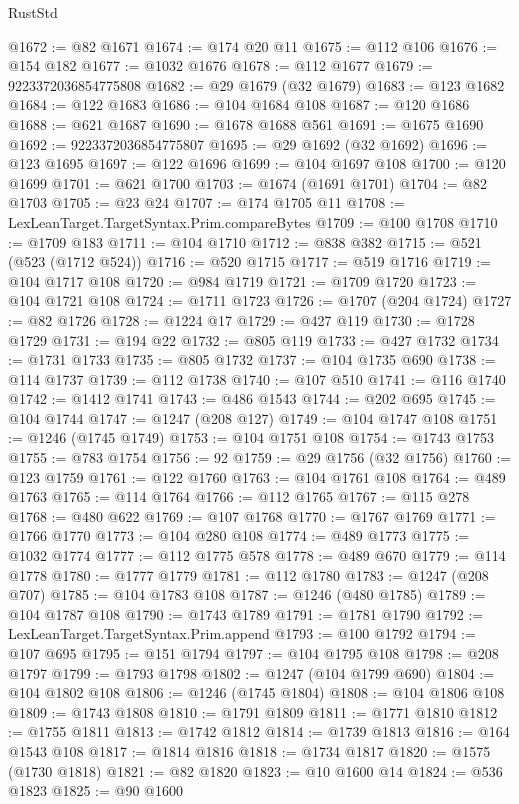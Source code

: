 \begin{lexlean}{RustStd}
\begin{coremodule}
@1672 := @82 @1671
@1674 := @174 @20 @11
@1675 := @112 @106
@1676 := @154 @182
@1677 := @1032 @1676
@1678 := @112 @1677
@1679 := 9223372036854775808
@1682 := @29 @1679 (@32 @1679)
@1683 := @123 @1682
@1684 := @122 @1683
@1686 := @104 @1684 @108
@1687 := @120 @1686
@1688 := @621 @1687
@1690 := @1678 @1688 @561
@1691 := @1675 @1690
@1692 := 9223372036854775807
@1695 := @29 @1692 (@32 @1692)
@1696 := @123 @1695
@1697 := @122 @1696
@1699 := @104 @1697 @108
@1700 := @120 @1699
@1701 := @621 @1700
@1703 := @1674 (@1691 @1701)
@1704 := @82 @1703
@1705 := @23 @24
@1707 := @174 @1705 @11
@1708 := LexLeanTarget.TargetSyntax.Prim.compareBytes
@1709 := @100 @1708
@1710 := @1709 @183
@1711 := @104 @1710
@1712 := @838 @382
@1715 := @521 (@523 (@1712 @524))
@1716 := @520 @1715
@1717 := @519 @1716
@1719 := @104 @1717 @108
@1720 := @984 @1719
@1721 := @1709 @1720
@1723 := @104 @1721 @108
@1724 := @1711 @1723
@1726 := @1707 (@204 @1724)
@1727 := @82 @1726
@1728 := @1224 @17
@1729 := @427 @119
@1730 := @1728 @1729
@1731 := @194 @22
@1732 := @805 @119
@1733 := @427 @1732
@1734 := @1731 @1733
@1735 := @805 @1732
@1737 := @104 @1735 @690
@1738 := @114 @1737
@1739 := @112 @1738
@1740 := @107 @510
@1741 := @116 @1740
@1742 := @1412 @1741
@1743 := @486 @1543
@1744 := @202 @695
@1745 := @104 @1744
@1747 := @1247 (@208 @127)
@1749 := @104 @1747 @108
@1751 := @1246 (@1745 @1749)
@1753 := @104 @1751 @108
@1754 := @1743 @1753
@1755 := @783 @1754
@1756 := 92
@1759 := @29 @1756 (@32 @1756)
@1760 := @123 @1759
@1761 := @122 @1760
@1763 := @104 @1761 @108
@1764 := @489 @1763
@1765 := @114 @1764
@1766 := @112 @1765
@1767 := @115 @278
@1768 := @480 @622
@1769 := @107 @1768
@1770 := @1767 @1769
@1771 := @1766 @1770
@1773 := @104 @280 @108
@1774 := @489 @1773
@1775 := @1032 @1774
@1777 := @112 @1775 @578
@1778 := @489 @670
@1779 := @114 @1778
@1780 := @1777 @1779
@1781 := @112 @1780
@1783 := @1247 (@208 @707)
@1785 := @104 @1783 @108
@1787 := @1246 (@480 @1785)
@1789 := @104 @1787 @108
@1790 := @1743 @1789
@1791 := @1781 @1790
@1792 := LexLeanTarget.TargetSyntax.Prim.append
@1793 := @100 @1792
@1794 := @107 @695
@1795 := @151 @1794
@1797 := @104 @1795 @108
@1798 := @208 @1797
@1799 := @1793 @1798
@1802 := @1247 (@104 @1799 @690)
@1804 := @104 @1802 @108
@1806 := @1246 (@1745 @1804)
@1808 := @104 @1806 @108
@1809 := @1743 @1808
@1810 := @1791 @1809
@1811 := @1771 @1810
@1812 := @1755 @1811
@1813 := @1742 @1812
@1814 := @1739 @1813
@1816 := @164 @1543 @108
@1817 := @1814 @1816
@1818 := @1734 @1817
@1820 := @1575 (@1730 @1818)
@1821 := @82 @1820
@1823 := @10 @1600 @14
@1824 := @536 @1823
@1825 := @90 @1600

\end{coremodule}
\end{lexlean}
